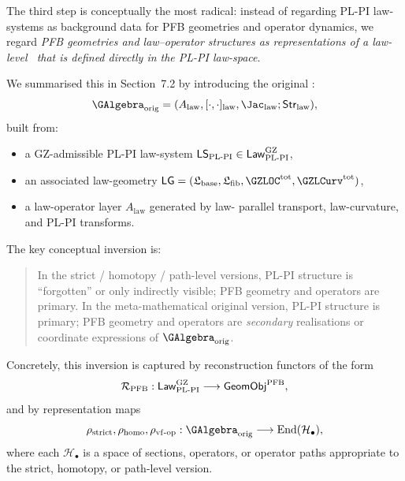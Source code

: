 \documentclass[11pt]{book}
\theoremstyle{plain}
\theoremstyle{definition}
\begin{document}
The third step is conceptually the most radical: instead of regarding
PL-PI law-systems as background data for PFB geometries and operator
dynamics, we regard \emph{PFB geometries and law--operator structures
as representations of a law-level \GAlgebra\ that is defined directly
in the PL-PI law-space}.

We summarised this in Section~7.2 by introducing the original
\GAlgebra:
\[
   \GAlgebra_{\mathrm{orig}}
   =
   (A_{\mathrm{law}},
    [\cdot,\cdot]_{\mathrm{law}},
    \Jac_{\mathrm{law}};\mathsf{Str}_{\mathrm{law}}),
\]
built from:

\begin{itemize}
  \item a GZ-admissible PL-PI law-system
        $\mathsf{LS}_{\mathrm{PL\text- PI}}\in
         \mathsf{Law}_{\mathrm{PL\text- PI}}^{\mathrm{GZ}}$,
  \item an associated law-geometry
        $\mathsf{LG}=(\mathfrak{L}_{\mathrm{base}},
                      \mathfrak{L}_{\mathrm{fib}},
                      \GZLOC^{\mathrm{tot}},
                      \GZLCurv^{\mathrm{tot}})$,
  \item a law-operator layer $A_{\mathrm{law}}$ generated by law-
        parallel transport, law-curvature, and PL-PI transforms.
\end{itemize}

The key conceptual inversion is:

\begin{quote}
  In the strict / homotopy / path-level versions, PL-PI structure is
  “forgotten” or only indirectly visible; PFB geometry and operators
  are primary. In the meta-mathematical original version, PL-PI
  structure is primary; PFB geometry and operators are \emph{secondary}
  realisations or coordinate expressions of $\GAlgebra_{\mathrm{orig}}$.
\end{quote}

Concretely, this inversion is captured by reconstruction functors of
the form
\[
   \mathcal{R}_{\mathrm{PFB}}:
     \mathsf{Law}_{\mathrm{PL\text- PI}}^{\mathrm{GZ}}
     \longrightarrow
     \mathsf{GeomObj}^{\mathrm{PFB}},
\]
and by representation maps
\[
   \rho_{\mathrm{strict}},
   \rho_{\mathrm{homo}},
   \rho_{\mathrm{vf\text- op}}:
     \GAlgebra_{\mathrm{orig}}
     \longrightarrow
     \mathrm{End}(\mathcal{H}_{\bullet}),
\]
where each $\mathcal{H}_\bullet$ is a space of sections, operators, or
operator paths appropriate to the strict, homotopy, or path-level
version.
\end{document}
